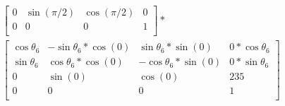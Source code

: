 \begin{multline}
\begin{bmatrix}
0 & \sin(\pi/2) & \cos(\pi/2) & 0 \\
0 & 0 & 0 & 1 \\
\end{bmatrix}
*\\
\begin{bmatrix}
\cos\theta_6 & -\sin\theta_6*\cos(0) & \sin\theta_6*\sin(0) & 0*\cos\theta_6 \\
\sin\theta_6 & \cos\theta_6*\cos(0) & -\cos\theta_6*\sin(0) & 0*\sin\theta_6 \\
0 & \sin(0) & \cos(0) & 235 \\
0 & 0 & 0 & 1 \\
\end{bmatrix}
\phantom{*}\\
\end{multline}
